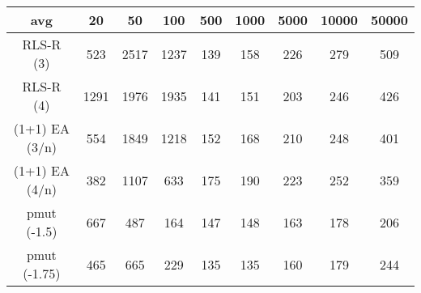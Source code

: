 \begin{tabular}[h]{ccccccccc}
avg&20&50&100&500&1000&5000&10000&50000\\\hline
RLS-R (3)&523&2517&1237&139&158&226&279&509\\
RLS-R (4)&1291&1976&1935&141&151&203&246&426\\
(1+1) EA (3/n)&554&1849&1218&152&168&210&248&401\\
(1+1) EA (4/n)&382&1107&633&175&190&223&252&359\\
pmut (-1.5)&667&487&164&147&148&163&178&206\\
pmut (-1.75)&465&665&229&135&135&160&179&244\\
\end{tabular}
